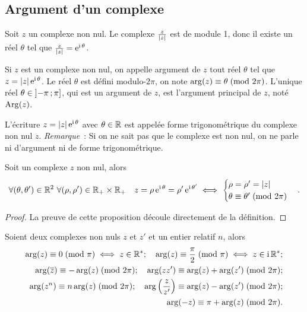 \subsection{Argument d'un complexe}
\label{subsec:argumentcomplexe}
Soit \(z\) un complexe non nul. Le complexe \(\frac{z}{\left\lvert z\right\rvert}\) est de module 
1, donc il existe un réel \(\theta\) tel que 
\(\frac{z}{\left\lvert z\right\rvert}=\operatorname{e}^{\operatorname{i} \theta}\).
\begin{defdef}
    Si \(z\) est un complexe non nul, on appelle argument de \(z\) tout réel 
    \(\theta\) tel que \(z=\left\lvert z\right\rvert \operatorname{e}^{\operatorname{i} \theta}\).  Le réel \(\theta\) est 
    défini modulo-\(2\pi\), on note \(\arg(z) \equiv \theta\!\pmod {2\pi}\). L'unique 
    réel \(\theta \in \left] -\pi \, ;  \pi \right]\), qui est un argument de \(z\), 
    est l'argument principal de \(z\), noté \(\operatorname{Arg}(z)\).
\end{defdef}
L'écriture \(z=\left\lvert z\right\rvert \operatorname{e}^{\operatorname{i} \theta}\) avec \(\theta \in \mathbb{R}\) est appelée forme 
trigonométrique du complexe non nul \(z\).
\emph{Remarque}~: Si on ne sait pas que le complexe est non nul, on ne parle ni d'argument ni de forme trigonométrique.
\begin{prop}
    Soit un complexe \(z\) non nul, alors
    \begin{equation}
        \forall (\theta, \theta') \in \mathbb{R}^2 \ \forall (\rho, \rho') \in \mathbb{R}_{+} 
        \times \mathbb{R}_{+} \quad z=\rho \operatorname{e}^{\operatorname{i} \theta}=\rho' \operatorname{e}^{\operatorname{i} \theta'} \iff
        \begin{cases}
            \rho = \rho' = \left\lvert z\right\rvert \\
            \theta \equiv \theta'\!\pmod {2\pi}
        \end{cases}.
    \end{equation}
\end{prop}
\begin{proof}
    La preuve de cette proposition découle directement de la définition.
\end{proof}
\begin{prop}
    Soient deux complexes non nuls \(z\) et \(z'\) et un entier relatif \(n\), 
    alors
    \begin{align*}
        \arg(z) \equiv 0\!\pmod {\pi} \iff z \in \mathbb{R}^*; \quad 
        \arg(z) \equiv \frac{\pi}{2}\!\pmod {\pi} \iff z \in \operatorname{i}\mathbb{R}^{*};\\
        \arg(\overline{z}) \equiv -\arg(z)\!\pmod {2\pi}; \quad \arg(z 
        z') \equiv \arg(z) + \arg(z')\!\pmod {2\pi}; \\
        \arg(z^n) \equiv n \arg(z)\!\pmod {2\pi}; \quad \arg 
        \left(\frac{z}{z'} \right) \equiv \arg(z) - \arg(z') \!\pmod {2\pi}; \\
        \arg(-z) \equiv \pi + \arg(z)\!\pmod {2\pi}.
    \end{align*}
\end{prop}
